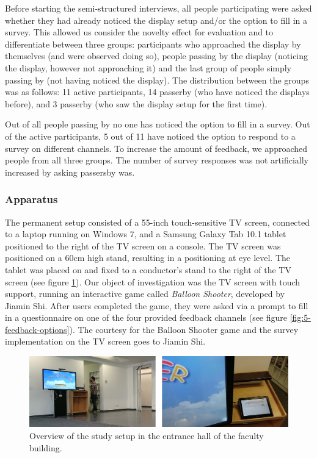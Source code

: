 		Before starting the semi-structured interviews, all people participating were asked whether they had already noticed the display setup and/or the option to fill in a survey. 
		This allowed us consider the novelty effect for evaluation and to differentiate between three groups: participants who approached the display by themselves (and were observed doing so), people passing by the display (noticing the display, however not approaching it) and the last group of people simply passing by (not having noticed the display). The distribution between the groups was as follows: 11 active participants, 14 passerby (who have noticed the displays before), and 3 passerby (who saw the display setup for the first time). 

		Out of all people passing by no one has noticed the option to fill in a survey. Out of the active participants, 5 out of 11 have noticed the option to respond to a survey on different channels.
		To increase the amount of feedback, we approached people from all three groups. The number of survey responses was not artificially increased by asking passersby was.
		



	\subsubsection{Apparatus}
	\label{chapter:field-study:apparatus}

		The permanent setup consisted of a 55-inch touch-sensitive TV screen, connected to a laptop running on Windows 7, and a Samsung Galaxy Tab 10.1 tablet positioned to the right of the TV screen on a console. The TV screen was positioned on a 60cm high stand, resulting in a positioning at eye level. The tablet was placed on and fixed to a conductor's stand to the right of the TV screen (see figure \ref{fig:5-study-setup}). Our object of investigation was the TV screen with touch support, running an interactive game called \textit{Balloon Shooter}, developed by Jiamin Shi. After users completed the game, they were asked via a prompt to fill in a questionnaire on one of the four provided feedback channels (see figure \ref{fig:5-feedback-options}). The courtesy for the Balloon Shooter game and the survey implementation on the TV screen goes to Jiamin Shi.

		\begin{figure}
		    \begin{center}
   \includegraphics[width=\columnwidth]{img/5_field-study/study-setup.jpg}
		    \end{center}
		 \caption{Overview of the study setup in the entrance hall of the faculty building.}
		 \label{fig:5-study-setup}
		\end{figure}

